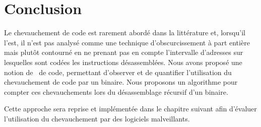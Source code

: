 
\section*{Conclusion}
Le chevauchement de code est rarement abordé dans la littérature et, lorsqu'il l'est, il n'est pas analysé comme une technique d'obscurcissement à part entière mais plutôt contourné en ne prenant pas en compte l'intervalle d'adresses sur lesquelles sont codées les instructions désassemblées.
Nous avons proposé une notion de \layer\ de code, permettant d'observer et de quantifier l'utilisation du chevauchement de code par un binaire. Nous proposons un algorithme pour compter ces chevauchements lors du désassemblage récursif d'un binaire.

Cette approche sera reprise et implémentée dans le chapitre suivant afin d'évaluer l'utilisation du chevauchement par des logiciels malveillants.
